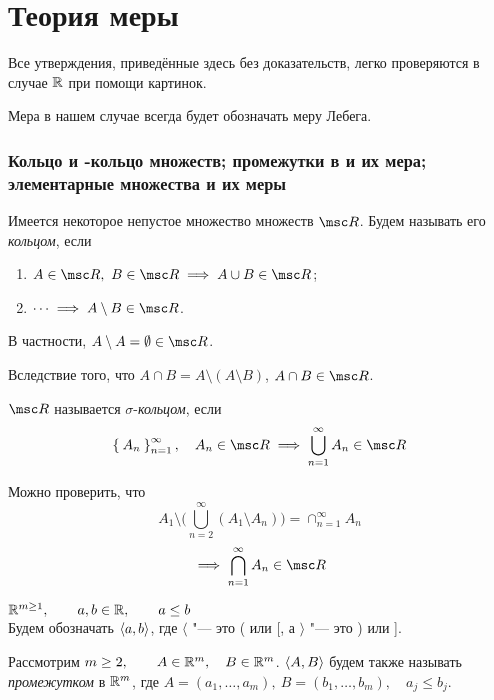 \part{Теория меры}

Все утверждения, приведённые здесь без доказательств, легко проверяются в случае $ \mathbb{R} $ при помощи картинок.

Мера в нашем случае всегда будет обозначать меру Лебега.

\section{Кольцо и -кольцо множеств; промежутки в  и их мера; элементарные множества и их меры}

\begin{definition}
	Имеется некоторое непустое множество множеств $ \msc R $. Будем называть его \emph{кольцом}, если
	\begin{enumerate}
		\item $ A \in \msc R, ~ B \in \msc R \implies A \cup B \in \msc R $;
		\item $ \dots \implies A \setminus B \in \msc R $.
	\end{enumerate}
\end{definition}

В частности, $ A \setminus A = \O \in \msc R $.

Вследствие того, что $ A \cap B = A \setminus (A \setminus B) $, $ A \cap B \in \msc R $.

\begin{definition}
	$ \msc R $ называется $ \sigma $-\emph{кольцом}, если
	$$ \set{A_n}_{n = 1}^\infty, \quad A_n \in \msc R \implies \bigcup_{n = 1}^\infty A_n \in \msc R $$
\end{definition}

Можно проверить, что
$$ A_1 \setminus \bigg( \bigcup_{n = 2}^\infty (A_1 \setminus A_n) \bigg) = \cap_{n = 1}^\infty A_n $$
$$ \implies \bigcap_{n = 1}^\infty A_n \in \msc R $$

$ \mathbb{R}^{m \ge 1}, \qquad a, b \in \mathbb{R}, \qquad a \le b $ \\
Будем обозначать $ \Braket{a, b} $, где $ \langle $ "--- это ( или [, а $ \rangle $ "--- это ) или ].

Рассмотрим $ m \ge 2, \qquad A \in \mathbb{R}^m, \quad B \in \mathbb{R}^m $. $ \Braket{A, B} $ будем также называть \emph{промежутком} в $ \mathbb{R}^m $, где $ A = (a_1, \dots, a_m), ~ B = (b_1, \dots, b_m), \quad a_j \le b_j $.

